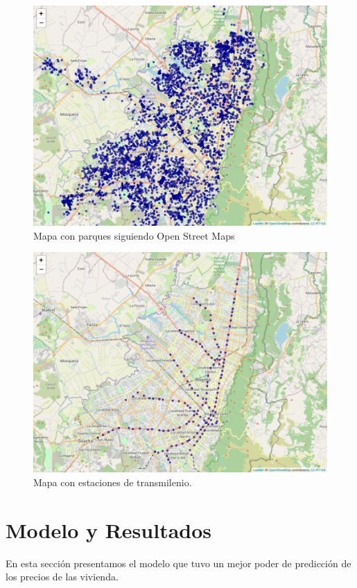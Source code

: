 \documentclass[12pt]{article}
\begin{document}
\begin{figure}[H]
    \centering
    \includegraphics[scale=0.50]{../views/mapas/park.png}
    \caption{Mapa con parques siguiendo Open Street Maps}
    \label{fig:mapaparques}
\end{figure}
\begin{figure}[H]
    \centering
    \includegraphics[scale=0.50]{../views/mapas/transmilenio.png}
    \caption{Mapa con estaciones de transmilenio.}
    \label{fig:mapatransmi}
\end{figure}

\section{Modelo y Resultados}
En esta sección presentamos el modelo que tuvo un mejor poder de predicción de los precios de las vivienda.
\end{document}
